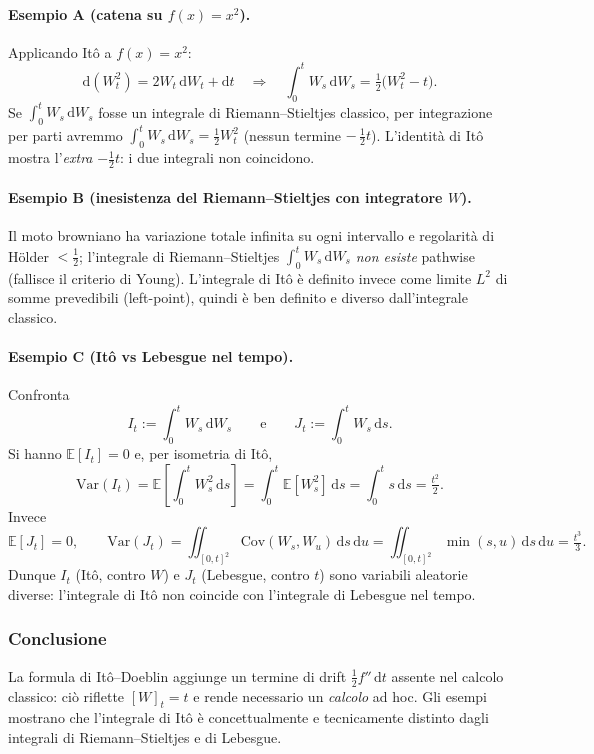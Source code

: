 \documentclass[12pt,a4paper]{book}
\theoremstyle{remark}
\newcommand{\EE}{\mathbb{E}}          %
\newcommand{\Var}{\mathrm{Var}}       %
\newcommand{\Cov}{\mathrm{Cov}}       %
\newcommand{\dd}{\mathrm{d}}
\begin{document}
\paragraph{Esempio A (catena su $f(x)=x^2$).}
Applicando It\^o a $f(x)=x^2$:
\[
\dd (W_t^2)= 2W_t\,\dd W_t + \dd t
\quad\Rightarrow\quad
\int_0^t W_s\,\dd W_s = \tfrac12\big(W_t^2 - t\big).
\]
Se $\int_0^t W_s\,\dd W_s$ fosse un integrale di Riemann--Stieltjes classico, per integrazione per parti avremmo
$\int_0^t W_s\,\dd W_s = \tfrac12 W_t^2$ (nessun termine $-\,\tfrac12 t$).
L’identità di It\^o mostra l’\emph{extra} $-\tfrac12 t$: i due integrali non coincidono.

\paragraph{Esempio B (inesistenza del Riemann--Stieltjes con integratore $W$).}
Il moto browniano ha variazione totale infinita su ogni intervallo e regolarità di Hölder $<\tfrac12$; l’integrale di Riemann--Stieltjes $\int_0^t W_s\,\dd W_s$ \emph{non esiste} pathwise (fallisce il criterio di Young). L’integrale di It\^o è definito invece come limite $L^2$ di somme prevedibili (left-point), quindi è ben definito e diverso dall’integrale classico.

\paragraph{Esempio C (It\^o vs Lebesgue nel tempo).}
Confronta
\[
I_t:=\int_0^t W_s\,\dd W_s
\qquad\text{e}\qquad
J_t:=\int_0^t W_s\,\dd s .
\]
Si hanno $\EE[I_t]=0$ e, per isometria di It\^o,
\[
\Var(I_t)= \EE\!\left[\int_0^t W_s^2\,\dd s\right]= \int_0^t \EE[W_s^2]\,\dd s = \int_0^t s\,\dd s = \tfrac{t^2}{2}.
\]
Invece
\[
\EE[J_t]=0,\qquad
\Var(J_t)= \iint_{[0,t]^2}\!\!\Cov(W_s,W_u)\,\dd s\,\dd u
= \iint_{[0,t]^2}\!\!\min(s,u)\,\dd s\,\dd u
= \tfrac{t^3}{3}.
\]
Dunque $I_t$ (It\^o, contro $W$) e $J_t$ (Lebesgue, contro $t$) sono variabili aleatorie diverse: l’integrale di It\^o non coincide con l’integrale di Lebesgue nel tempo.

\subsubsection*{Conclusione}
La formula di It\^o--Doeblin aggiunge un termine di drift $\tfrac12 f''\,\dd t$ assente nel calcolo classico: ciò riflette $[W]_t=t$ e rende necessario un \emph{calcolo} ad hoc. Gli esempi mostrano che l’integrale di It\^o è concettualmente e tecnicamente distinto dagli integrali di Riemann--Stieltjes e di Lebesgue.
\end{document}
